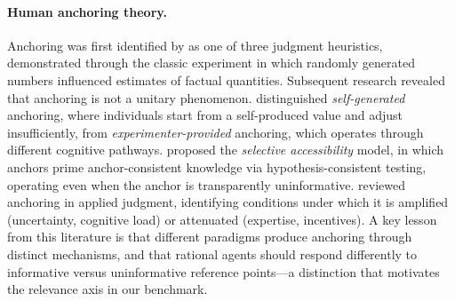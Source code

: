 \paragraph{Human anchoring theory.}
Anchoring was first identified by \citet{tversky1974judgment} as
one of three judgment heuristics, demonstrated through the
classic experiment in which randomly generated numbers influenced
estimates of factual quantities.
Subsequent research revealed that anchoring is not a unitary
phenomenon.
\citet{epley2001putting} distinguished \emph{self-generated}
anchoring, where individuals start from a self-produced value
and adjust insufficiently, from \emph{experimenter-provided}
anchoring, which operates through different cognitive pathways.
\citet{mussweiler1999hypothesis} proposed the \emph{selective
accessibility} model, in which anchors prime anchor-consistent
knowledge via hypothesis-consistent testing, operating even when
the anchor is transparently uninformative.
\citet{chapman1999anchoring} reviewed anchoring in applied
judgment, identifying conditions under which it is amplified
(uncertainty, cognitive load) or attenuated (expertise,
incentives).
A key lesson from this literature is that different paradigms
produce anchoring through distinct mechanisms, and that rational
agents should respond differently to informative versus
uninformative reference points---a distinction that motivates
the relevance axis in our benchmark.

